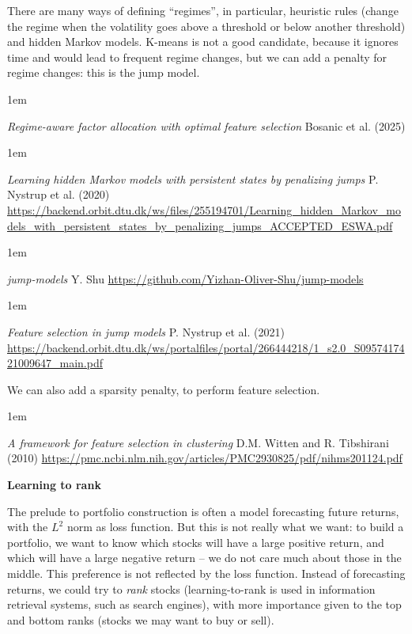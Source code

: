 \documentclass[a5paper]{article}
\newenvironment{reference}{%
  \medskip\goodbreak
  \parskip 0pt
  \raggedright
  \leftskip 1em
  \obeylines
}{\par\medskip\goodbreak}
\def\subsection#1{{\par\bigskip\goodbreak\large\bfseries #1\par}}
\begin{document}
There are many ways of defining ``regimes'',
in particular,
heuristic rules (change the regime when the volatility goes above a threshold or below another threshold)
and hidden Markov models.
K-means is not a good candidate, because it ignores time and would lead to frequent regime changes,
but we can add a penalty for regime changes: this is the jump model.

\begin{reference}
  \emph{Regime-aware factor allocation with optimal feature selection}
  Bosanic et al. (2025)
\end{reference}

\begin{reference}
  \emph{Learning hidden Markov models with persistent states by penalizing jumps}
  P. Nystrup et al. (2020)
  \url{https://backend.orbit.dtu.dk/ws/files/255194701/Learning_hidden_Markov_models_with_persistent_states_by_penalizing_jumps_ACCEPTED_ESWA.pdf}
\end{reference}

\begin{reference}
  \emph{jump-models}
  Y. Shu
  \url{https://github.com/Yizhan-Oliver-Shu/jump-models}
\end{reference}

\begin{reference}
  \emph{Feature selection in jump models}
  P. Nystrup et al. (2021)
  \url{https://backend.orbit.dtu.dk/ws/portalfiles/portal/266444218/1_s2.0_S0957417421009647_main.pdf}
\end{reference}

We can also add a sparsity penalty, to perform feature selection.

\begin{reference}
  \emph{A framework for feature selection in clustering}
  D.M. Witten and R. Tibshirani (2010)
  \url{https://pmc.ncbi.nlm.nih.gov/articles/PMC2930825/pdf/nihms201124.pdf}
\end{reference}

\subsection{Learning to rank}

The prelude to portfolio construction is often a model forecasting
future returns, with the $L^2$ norm as loss function.
But this is not really what we want: to build a portfolio,
we want to know which stocks will have a large positive return,
and which will have a large negative return --
we do not care much about those in the middle.
This preference is not reflected by the loss function.
Instead of forecasting returns,
we could try to \emph{rank} stocks
(learning-to-rank is used in information retrieval systems, such as search engines),
with more importance given to the top and bottom ranks
(stocks we may want to buy or sell).
\end{document}
